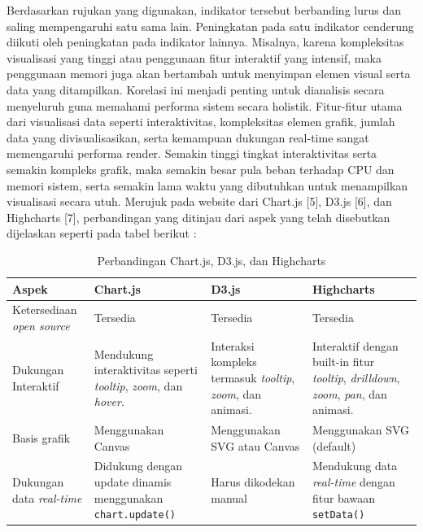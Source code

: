 Berdasarkan rujukan yang digunakan, indikator tersebut berbanding lurus dan saling mempengaruhi satu sama lain. Peningkatan pada satu indikator cenderung diikuti oleh peningkatan pada indikator lainnya. Misalnya, karena kompleksitas visualisasi yang tinggi atau penggunaan fitur interaktif yang intensif, maka penggunaan memori juga akan bertambah untuk menyimpan elemen visual serta data yang ditampilkan. Korelasi ini menjadi penting untuk dianalisis secara menyeluruh guna memahami performa sistem secara holistik. Fitur-fitur utama dari visualisasi data seperti interaktivitas, kompleksitas elemen grafik, jumlah data yang divisualisasikan, serta kemampuan dukungan real-time sangat memengaruhi performa render. Semakin tinggi tingkat interaktivitas serta semakin kompleks grafik, maka semakin besar pula beban terhadap CPU dan memori sistem, serta semakin lama waktu yang dibutuhkan untuk menampilkan visualisasi secara utuh. Merujuk pada website dari Chart.js [5], D3.js [6], dan Highcharts [7], perbandingan yang ditinjau dari aspek yang telah disebutkan dijelaskan seperti pada tabel berikut :
\begin{table}[H]
	\centering
	\renewcommand{\arraystretch}{1.5} %
	\caption{Perbandingan Chart.js, D3.js, dan Highcharts}
	\label{tab:perbandingan_library}
	\begin{tabular}{|>{\raggedright\arraybackslash}p{3.5cm}
			|>{\raggedright\arraybackslash}p{3.5cm}
			|>{\raggedright\arraybackslash}p{3.5cm}
			|>{\raggedright\arraybackslash}p{3.5cm}|}
		\hline
		\rowcolor[gray]{0.85}
		\textbf{Aspek} & \textbf{Chart.js} & \textbf{D3.js} & \textbf{Highcharts} \\
		\hline
		Ketersediaan \textit{open source} 
		& Tersedia 
		& Tersedia 
		& Tersedia \\ 
		\hline
		Dukungan Interaktif 
		& Mendukung interaktivitas seperti \textit{tooltip}, \textit{zoom}, dan \textit{hover}. 
		& Interaksi kompleks termasuk \textit{tooltip}, \textit{zoom}, dan animasi.
		& Interaktif dengan built-in fitur \textit{tooltip}, \textit{drilldown}, \textit{zoom}, \textit{pan}, dan animasi. \\
		\hline
		Basis grafik 
		& Menggunakan Canvas 
		& Menggunakan SVG atau Canvas 
		& Menggunakan SVG (default) \\
		\hline
		Dukungan data \textit{real-time} 
		& Didukung dengan update dinamis menggunakan \texttt{chart.update()} 
		& Harus dikodekan manual 
		& Mendukung data \textit{real-time} dengan fitur bawaan \texttt{setData()} \\
		\hline
	\end{tabular}
\end{table}

